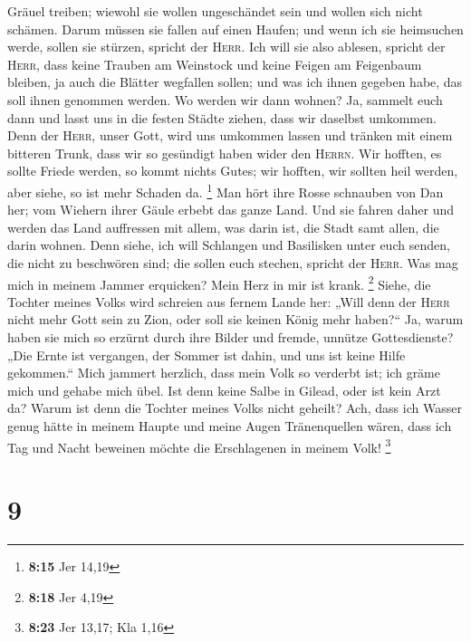 Gräuel treiben; wiewohl sie wollen ungeschändet sein und wollen sich
nicht schämen. Darum müssen sie fallen auf einen Haufen; und wenn ich
sie heimsuchen werde, sollen sie stürzen, spricht der \textsc{Herr}.
 Ich will sie also ablesen, spricht der \textsc{Herr},
dass keine Trauben am Weinstock und keine Feigen am Feigenbaum bleiben,
ja auch die Blätter wegfallen sollen; und was ich ihnen gegeben habe,
das soll ihnen genommen werden.  Wo werden wir dann
wohnen? Ja, sammelt euch dann und lasst uns in die festen Städte ziehen,
dass wir daselbst umkommen. Denn der \textsc{Herr}, unser Gott, wird uns
umkommen lassen und tränken mit einem bitteren Trunk, dass wir so
gesündigt haben wider den \textsc{Herrn}.  Wir hofften,
es sollte Friede werden, so kommt nichts Gutes; wir hofften, wir sollten
heil werden, aber siehe, so ist mehr Schaden da. \footnote{\textbf{8:15}
  Jer 14,19}  Man hört ihre Rosse schnauben von Dan her;
vom Wiehern ihrer Gäule erbebt das ganze Land. Und sie fahren daher und
werden das Land auffressen mit allem, was darin ist, die Stadt samt
allen, die darin wohnen.  Denn siehe, ich will Schlangen
und Basilisken unter euch senden, die nicht zu beschwören sind; die
sollen euch stechen, spricht der \textsc{Herr}.  Was mag
mich in meinem Jammer erquicken? Mein Herz in mir ist krank. \footnote{\textbf{8:18}
  Jer 4,19}  Siehe, die Tochter meines Volks wird
schreien aus fernem Lande her: „Will denn der \textsc{Herr} nicht mehr
Gott sein zu Zion, oder soll sie keinen König mehr haben?{}`` Ja, warum
haben sie mich so erzürnt durch ihre Bilder und fremde, unnütze
Gottesdienste?  „Die Ernte ist vergangen, der Sommer ist
dahin, und uns ist keine Hilfe gekommen.``  Mich jammert
herzlich, dass mein Volk so verderbt ist; ich gräme mich und gehabe mich
übel.  Ist denn keine Salbe in Gilead, oder ist kein Arzt
da? Warum ist denn die Tochter meines Volks nicht geheilt?
 Ach, dass ich Wasser genug hätte in meinem Haupte und
meine Augen Tränenquellen wären, dass ich Tag und Nacht beweinen möchte
die Erschlagenen in meinem Volk! \footnote{\textbf{8:23} Jer 13,17; Kla
  1,16}

\hypertarget{section-3}{%
\section{9}\label{section-3}}

